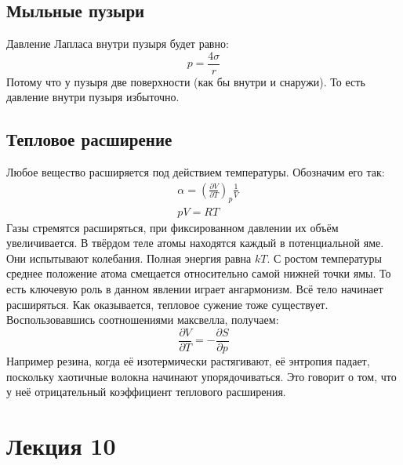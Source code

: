 \documentclass[a4paper, 12pt]{article}
\begin{document}
	\subsection{Мыльные пузыри}
	Давление Лапласа внутри пузыря будет равно:
	\begin{equation*}
		p = \frac{4 \sigma}{r}
	\end{equation*}
	Потому что у пузыря две поверхности (как бы внутри и снаружи). То есть давление внутри пузыря избыточно. 
	\subsection{Тепловое расширение}
	Любое вещество расширяется под действием температуры. Обозначим его так:
	\begin{equation*}
		\begin{aligned}
			& \alpha =( \frac{\partial V}{\partial T} )_{p}\frac{1}{V} \\
			& pV = RT                                                  
		\end{aligned}
	\end{equation*}
	Газы стремятся расширяться, при фиксированном давлении их объём увеличивается. В твёрдом теле атомы находятся каждый в потенциальной яме. Они испытывают колебания. Полная энергия равна $kT$. С ростом температуры среднее положение атома смещается относительно самой нижней точки ямы. То есть ключевую роль в данном явлении играет ангармонизм. Всё тело начинает расширяться. Как оказывается, тепловое сужение тоже существует. Воспользовавшись соотношениями максвелла, получаем:
	\begin{equation*}
		\frac{\partial V}{\partial T} = - \frac{\partial S}{\partial p}
	\end{equation*}
	Например резина, когда её изотермически растягивают, её энтропия падает, поскольку хаотичные волокна начинают упорядочиваться. Это говорит о том, что у неё отрицательный коэффициент теплового расширения.
	\section{Лекция 10}
\end{document}
